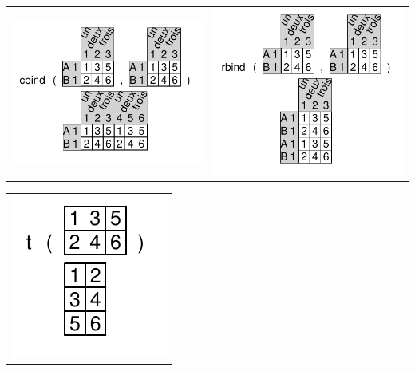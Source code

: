 \documentclass[pdflatex]{article}
\begin{document}
\begin{tabular}{cc}
\includegraphics{cbind.pdf} & \includegraphics{rbind.pdf}\\
\end{tabular}

\begin{tabular}{c}
\includegraphics{t.pdf}\\
\end{tabular}
\end{document}
